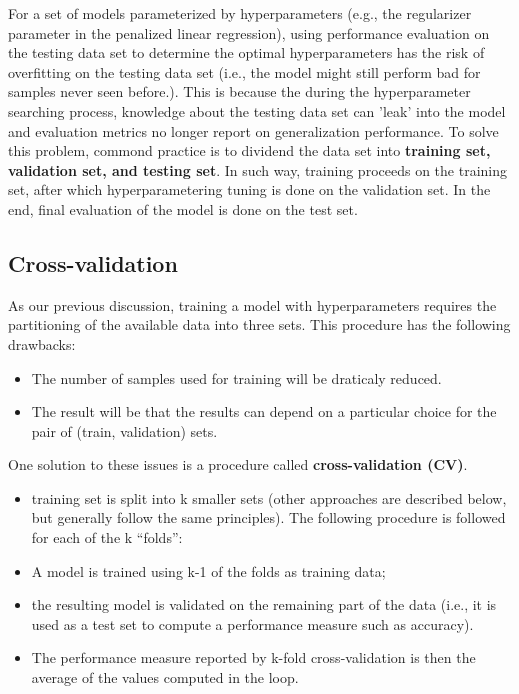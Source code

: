 \begin{refsection}
For a set of models parameterized by hyperparameters (e.g., the regularizer parameter in the penalized linear regression), using performance evaluation on the testing data set to determine the optimal hyperparameters has the risk of  overfitting on the testing data set (i.e., the model might still perform bad for samples never seen before.). This is because the during the hyperparameter searching process, knowledge about the testing data set can 'leak' into the model and evaluation metrics no longer report on generalization performance. To solve this problem, commond practice is to dividend the data set into \textbf{training set, validation set, and testing set}. 
In such way, training proceeds on the training set, after which hyperparametering tuning is done on the validation set. In the end, final evaluation of the model is done on the test set.

\subsection{Cross-validation}

As our previous discussion, training a model with hyperparameters requires the partitioning of the available data into three sets. This procedure has the following drawbacks:
\begin{itemize}
	\item The number of samples used for training will be draticaly reduced.
	\item The result will be that the results can depend on a particular choice for the pair of (train, validation) sets.
\end{itemize} 

One solution to these issues is a procedure called \textbf{cross-validation (CV)}. 
\begin{method}
\begin{itemize}
	 \item training set is split into k smaller sets (other approaches are described below, but generally follow the same principles). The following procedure is followed for each of the k “folds”:
	 
	 \item A model is trained using k-1 of the folds as training data;
	 \item the resulting model is validated on the remaining part of the data (i.e., it is used as a test set to compute a performance measure such as accuracy).
	 \item The performance measure reported by k-fold cross-validation is then the average of the values computed in the loop.
\end{itemize}	
\end{method}



\end{refsection}
